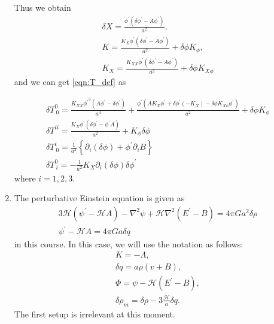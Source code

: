 \documentclass[a4paper,pdftex,10pt]{article}
\begin{document}
\begin{enumerate}
        Thus we obtain
        \begin{gather}
          \delta X
          =
          \frac{\phi^{\prime} (\delta \phi^{\prime}-A \phi^{\prime})}{a^2}
          ,
          \\
          K
          =
          \frac{K_X \phi^{\prime} (\delta \phi^{\prime}-A \phi^{\prime})}{a^2}+\delta \phi  K_{\phi }
          ,
          \\
          K_{X}
          =
          \frac{K_{XX} \phi^{\prime} (\delta \phi^{\prime}-A \phi^{\prime})}{a^2}+\delta \phi  K_{X \phi}
        \end{gather}
        and we can get \eqref{eqn:T_def} as
        \begin{graybox}
          \vspace*{-10pt}
          \begin{gather}
            \delta T^{0}_{\ 0}
            =
            \frac{K_{XX} {\phi^{\prime}}^3 (A {\phi^{\prime}}-{\delta \phi^{\prime}})}{a^4}+\frac{{\phi^{\prime}} (A K_X {\phi^{\prime}}+{\delta \phi^{\prime}} (-K_X)-\delta \phi  K_{X \phi} {\phi^{\prime}})}{a^2}+\delta \phi  K_{\phi }
            \\
            \delta T^{ii}
            =
            \frac{K_{X}\phi^{\prime}(\delta\phi^{\prime}-\phi^{\prime}A)}{a^2}+K_{\phi}\delta\phi
            \\
            \delta T^{i}_{\ 0}
            =
            \frac{1}{a^2}
            \left\{
            \partial_{i}(\delta\phi)+\phi^{\prime}\partial_{i}B
            \right\}
            \\
            \delta T^{0}_{\ i}
            =
            -\frac{1}{a^2}K_{X}\partial_{i}(\delta\phi)\delta\phi^{\prime}
          \end{gather}
          where $i=1,2,3$.
        \end{graybox}

  \item
        The perturbative Einstein equation is given as
        \begin{gather}
          3\mathcal{H}(\psi^{\prime}-\mathcal{H}A)-\nabla^2\psi+\mathcal{H}\nabla^2(E^{\prime}-B)
          =
          4\pi Ga^2\delta\rho
          \label{eqn:hoge_1}
          \\
          \psi^{\prime}-\mathcal{H}A=4\pi Ga\delta q
          \label{eqn:hoge_2}
        \end{gather}
        in this course. In this case, we will use the notation as follows:
        \begin{gather}
          K=-\Lambda
          ,
          \\
          \delta q=a\rho(v+B)
          \label{eqn:deltaq}
          ,
          \\
          \Phi = \psi-\mathcal{H}(E^{\prime}-B)
          \label{eqn:PHI}
          ,
          \\
          \delta\rho_{m}
          =
          \delta\rho
          -
          3\frac{\mathcal{H}}{a}\delta q
          \label{eqn:deltarhom}
          .
        \end{gather}
        The first setup is irrelevant at this moment.


\end{enumerate}
\end{document}
